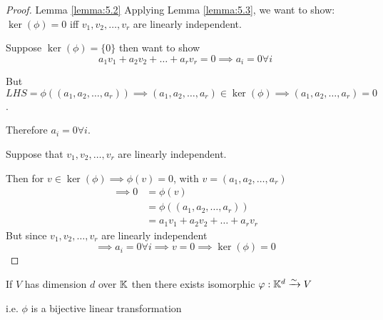 \begin{proof} {Lemma \ref{lemma:5.2}}
    Applying Lemma \ref{lemma:5.3}, we want to show: \(\ker(\phi) = {0}\) iff \(v_1, v_2, \dots, v_r\) are linearly independent.

    \pffwd Suppose \(\ker(\phi) = \{0\}\) then want to show \[
        a_1v_1 + a_2v_2 + \dots + a_rv_r = 0 \implies a_i = 0 \forall i
    \]

    But \(LHS = \phi((a_1, a_2, \dots, a_r))  \implies (a_1, a_2, \dots, a_r) \in \ker(\phi) \implies (a_1, a_2, \dots, a_r)  = 0\).

    Therefore \(a_i = 0 \forall i\).

    \pfbwd Suppose that \(v_1, v_2, \dots, v_r\) are linearly independent.

    Then for \(v \in \ker(\phi) \implies \phi(v) = 0\), with \(v = (a_1, a_2, \dots, a_r)\)
    \begin{align*}
        \implies 0 & =\phi(v)                           \\
                   & = \phi((a_1, a_2, \dots, a_r))     \\
                   & = a_1v_1 + a_2v_2 + \dots + a_rv_r
    \end{align*}
    But since \(v_1, v_2, \dots, v_r\) are linearly independent
    \[
        \implies a_i = 0 \forall i \implies v = 0 \implies \ker(\phi) = {0}
    \]
\end{proof}

\begin{corollary}
    If \(V\) has dimension \(d\) over \(\mathbb{K}\) then there exists isomorphic \(\varphi: \mathbb{K}^d \xrightarrow{\sim} V\)

    i.e. \(\phi\) is a bijective linear transformation
\end{corollary}

